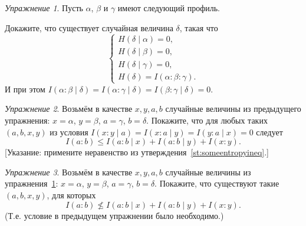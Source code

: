 \documentclass[12pt]{article}
\theoremstyle{definition}
\theoremstyle{plain}
\theoremstyle{remark}
\newtheorem{exercise}{Упражнение}[section]
\begin{document}
\begin{exercise}\label{ex:existsdelta}
    Пусть $\alpha$, $\beta$ и $\gamma$ имеют следующий профиль.
    \begin{center}
    \end{center}
    Докажите, что существует случайная величина $\delta$, такая что
    \[
        \begin{cases}
            H(\delta\mid\alpha) = 0,\\
            H(\delta\mid\beta)  = 0,\\
            H(\delta\mid\gamma) = 0,\\
            H(\delta) = I(\alpha:\beta:\gamma).
        \end{cases}
    \]
    И при этом $I(\alpha:\beta\mid\delta) = I(\alpha:\gamma\mid\delta) = I(\beta:\gamma\mid\delta) =
    0$.
\end{exercise}
\begin{exercise}
    Возьмём в качестве $x,y,a,b$ случайные величины из предыдущего упражнения: $x=\alpha$,
    $y=\beta$, $a=\gamma$, $b=\delta$. Покажите, что для любых таких $(a,b,x,y)$ из условия
    $I(x:y\mid a) = I(x:a\mid y) = I(y:a\mid x) = 0$ следует 
    \[
        I(a:b)\le I(a:b\mid x) + I(a:b\mid y) + I(x:y).     
    \]
    [Указание: примените неравенство из утверждения~\ref{st:someentropyineq}.]
\end{exercise}
\begin{exercise} 
    Возьмём в качестве $x,y,a,b$ случайные величины из упражнения~\ref{ex:existsdelta}: $x=\alpha$,
    $y=\beta$, $a=\gamma$, $b=\delta$. Покажите, что существуют такие $(a,b,x,y)$, для которых 
    \[
        I(a:b)\not\le I(a:b\mid x) + I(a:b\mid y) + I(x:y).     
    \]
    (Т.е. условие в предыдущем упражнении было необходимо.)
\end{exercise}
\end{document}
